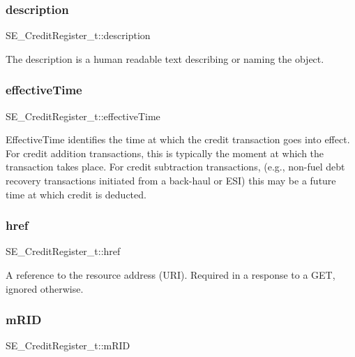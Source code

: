 \subsubsection{\texorpdfstring{description}{description}}
{\footnotesize\ttfamily S\+E\+\_\+\+Credit\+Register\+\_\+t\+::description}

The description is a human readable text describing or naming the object. \mbox{\label{group__CreditRegister_gabed95bad275808f5aefbf623bc20aaec}} 
\subsubsection{\texorpdfstring{effective\+Time}{effectiveTime}}
{\footnotesize\ttfamily S\+E\+\_\+\+Credit\+Register\+\_\+t\+::effective\+Time}

Effective\+Time identifies the time at which the credit transaction goes into effect. For credit addition transactions, this is typically the moment at which the transaction takes place. For credit subtraction transactions, (e.\+g., non-\/fuel debt recovery transactions initiated from a back-\/haul or E\+SI) this may be a future time at which credit is deducted. \mbox{\label{group__CreditRegister_ga6dc29bbd10dc51848e6fbedbfbdbc428}} 
\subsubsection{\texorpdfstring{href}{href}}
{\footnotesize\ttfamily S\+E\+\_\+\+Credit\+Register\+\_\+t\+::href}

A reference to the resource address (U\+RI). Required in a response to a G\+ET, ignored otherwise. \mbox{\label{group__CreditRegister_ga08dc81d2c42276324c84c732071a907a}} 
\subsubsection{\texorpdfstring{m\+R\+ID}{mRID}}
{\footnotesize\ttfamily S\+E\+\_\+\+Credit\+Register\+\_\+t\+::m\+R\+ID}

